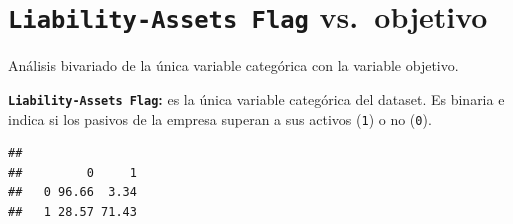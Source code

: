 \documentclass[
]{book}
\newenvironment{Shaded}{\begin{snugshade}}{\end{snugshade}}
\newcommand{\AttributeTok}[1]{\textcolor[rgb]{0.13,0.29,0.53}{#1}}
\newcommand{\DecValTok}[1]{\textcolor[rgb]{0.00,0.00,0.81}{#1}}
\newcommand{\FunctionTok}[1]{\textcolor[rgb]{0.13,0.29,0.53}{\textbf{#1}}}
\newcommand{\NormalTok}[1]{#1}
\newcommand{\OtherTok}[1]{\textcolor[rgb]{0.56,0.35,0.01}{#1}}
\newcommand{\SpecialCharTok}[1]{\textcolor[rgb]{0.81,0.36,0.00}{\textbf{#1}}}
\newcommand{\StringTok}[1]{\textcolor[rgb]{0.31,0.60,0.02}{#1}}
\begin{document}
\section{\texorpdfstring{\texttt{Liability-Assets\ Flag} vs.~objetivo}{Liability-Assets Flag vs.~objetivo}}\label{liability-assets-flag-vs.-objetivo}

Análisis bivariado de la única variable categórica con la variable objetivo.

\textbf{\texttt{Liability-Assets\ Flag}:} es la única variable categórica del dataset. Es binaria e
indica si los pasivos de la empresa superan a sus activos (\texttt{1}) o no (\texttt{0}).

\begin{Shaded}
\end{Shaded}

\begin{verbatim}
##    
##         0     1
##   0 96.66  3.34
##   1 28.57 71.43
\end{verbatim}
\end{document}
